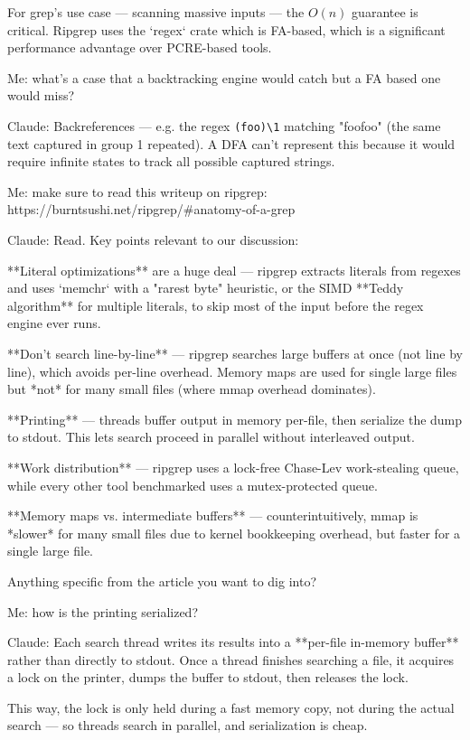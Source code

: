 \documentclass[letterpaper,twocolumn,10pt]{article}
\begin{document}
For grep's use case --- scanning massive inputs --- the $O(n)$ guarantee is critical. Ripgrep uses the `regex` crate which is FA-based, which is a significant performance advantage over PCRE-based tools.

Me: what's a case that a backtracking engine would catch but a FA based one would miss?

Claude: Backreferences --- e.g. the regex \verb|(foo)\1| matching "foofoo" (the same text captured in group 1 repeated). A DFA can't represent this because it would require infinite states to track all possible captured strings.

Me: make sure to read this writeup on ripgrep:
https://burntsushi.net/ripgrep/\#anatomy-of-a-grep

Claude: Read. Key points relevant to our discussion:

**Literal optimizations** are a huge deal --- ripgrep extracts literals from regexes and uses `memchr` with a "rarest byte" heuristic, or the SIMD **Teddy algorithm** for multiple literals, to skip most of the input before the regex engine ever runs.

**Don't search line-by-line** --- ripgrep searches large buffers at once (not line by line), which avoids per-line overhead. Memory maps are used for single large files but *not* for many small files (where mmap overhead dominates).

**Printing** --- threads buffer output in memory per-file, then serialize the dump to stdout. This lets search proceed in parallel without interleaved output.

**Work distribution** --- ripgrep uses a lock-free Chase-Lev work-stealing queue, while every other tool benchmarked uses a mutex-protected queue.

**Memory maps vs. intermediate buffers** --- counterintuitively, mmap is *slower* for many small files due to kernel bookkeeping overhead, but faster for a single large file.

Anything specific from the article you want to dig into?

Me: how is the printing serialized?

Claude: Each search thread writes its results into a **per-file in-memory buffer** rather than directly to stdout. Once a thread finishes searching a file, it acquires a lock on the printer, dumps the buffer to stdout, then releases the lock.

This way, the lock is only held during a fast memory copy, not during the actual search --- so threads search in parallel, and serialization is cheap.
\end{document}
